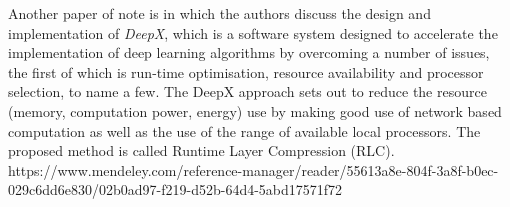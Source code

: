 \documentclass[conference]{IEEEtran}
\begin{document}
Another paper of note is \cite{Lane2016} in which the authors discuss the design and implementation of \textit{DeepX}, which is a software system designed to accelerate the implementation of deep learning algorithms by overcoming a number of issues, the first of which is run-time optimisation, resource availability and processor selection, to name a few. The DeepX approach sets out to reduce the resource (memory, computation power, energy) use by making good use of network based computation as well as the use of the range of available local processors. The proposed method is called Runtime Layer Compression (RLC). https://www.mendeley.com/reference-manager/reader/55613a8e-804f-3a8f-b0ec-029c6dd6e830/02b0ad97-f219-d52b-64d4-5abd17571f72





\printbibliography
\vspace{12pt}
\end{document}
